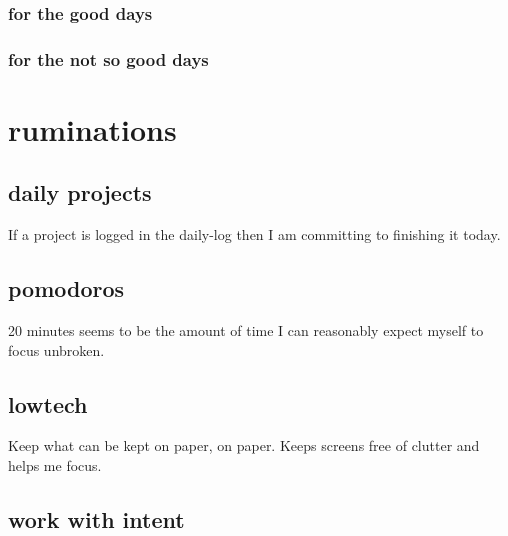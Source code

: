 \documentclass[]{book}
\begin{document}
\hypertarget{for-the-good-days}{%
\subsection{for the good days}\label{for-the-good-days}}

\hypertarget{for-the-not-so-good-days}{%
\subsection{for the not so good days}\label{for-the-not-so-good-days}}

\hypertarget{ruminations}{%
\chapter{ruminations}\label{ruminations}}

\hypertarget{daily-projects}{%
\section{daily projects}\label{daily-projects}}

If a project is logged in the \protect\hypertarget{daily-log}{}{daily-log} then I am committing to finishing it today.

\hypertarget{pomodoros}{%
\section{pomodoros}\label{pomodoros}}

20 minutes seems to be the amount of time I can reasonably expect myself to focus unbroken.

\hypertarget{lowtech}{%
\section{lowtech}\label{lowtech}}

Keep what can be kept on paper, on paper. Keeps screens free of clutter and helps me focus.

\hypertarget{work-with-intent}{%
\section{work with intent}\label{work-with-intent}}
\end{document}
